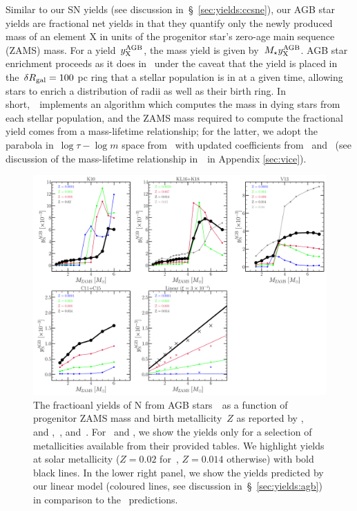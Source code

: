 \documentclass[ms.tex]{subfiles}
\begin{document}
Similar to our SN yields (see discussion in~\S~\ref{sec:yields:ccsne}), our
AGB star yields are fractional net yields in that they quantify only the newly
produced mass of an element X in units of the progenitor star's zero-age main
sequence (ZAMS) mass.
For a yield~$y_\text{X}^\text{AGB}$, the mass yield is given by~$M_\star y_\text{X}^\text{AGB}$.
AGB star enrichment proceeds as it does in~\citet{Johnson2020} under the caveat
that the yield is placed in the~$\delta R_\text{gal} = 100$ pc ring that a stellar
population is in at a given time, allowing stars to enrich a distribution of
radii as well as their birth ring.
In short,~\vice~implements an algorithm which computes the mass in dying stars
from each stellar population, and the ZAMS mass required to compute the
fractional yield comes from a mass-lifetime relationship; for the latter, we
adopt the parabola in~$\log\tau - \log m$ space from~\citet{Larson1974} with
updated coefficients from~\citet{Kobayashi2004} and~\citet*{David1990} (see
discussion of the mass-lifetime relationship in~\vice~in Appendix
\ref{sec:vice}).

\begin{figure}
\centering
\includegraphics[scale = 0.32]{agb_yield_models.pdf}
\caption{
The fractioanl yields of N from AGB stars~~as a function of progenitor
ZAMS mass and birth metallicity~$Z$ as reported by
\citet[][upper left]{Karakas2010},~\citet{Karakas2016} and
\citet[][upper middle]{Karakas2018},~\citet[][upper right]{Ventura2013,
Ventura2014, Ventura2018, Ventura2020}, and~\citet[][lower right]{Cristallo2011,
Cristallo2015}.
For~\citet{Ventura2013, Ventura2014, Ventura2018, Ventura2020} and
\citet{Cristallo2011, Cristallo2015}, we show the yields only for a selection
of metallicities available from their provided tables.
We highlight yields at solar metallicity ($Z = 0.02$ for~\citealp{Karakas2010},
$Z = 0.014$ otherwise) with bold black lines.
In the lower right panel, we show the yields predicted by our linear model
(coloured lines, see discussion in~\S~\ref{sec:yields:agb}) in comparison to
the~\citet[][coloured X's]{Cristallo2011, Cristallo2015} predictions.
}
\label{fig:agb_yield_models}
\end{figure}
\end{document}

